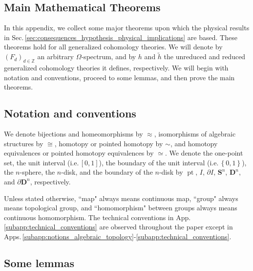 \documentclass[sort&compress]{elsarticle}
\theoremstyle{theoremstyle}
\theoremstyle{framedtheoremstyle}
\theoremstyle{definitionstyle}
\theoremstyle{definitionstyle}
\theoremstyle{definitionstyle}
\theoremstyle{definitionstyle}
\theoremstyle{nameddefinitionstyle}
\theoremstyle{framednameddefinitionstyle}
\theoremstyle{proofstyle}
\theoremstyle{definitionstyle}
\newcommand{\ZZZ}{\mathbb{Z}}
\newcommand{\DD}{\mathbf{D}}
\renewcommand{\SS}{\mathbf{S}}
\newcommand{\homeomorphic}{\approx}
\newcommand{\homotopic}{\simeq}
\newcommand{\isomorphic}{\cong}
\newcommand{\paren}[1]{\left( #1 \right)}
\newcommand{\braces}[1]{\left\{ #1 \right\}}
\DeclareMathOperator{\pt}{pt}
\begin{document}
\begin{appendices}

\section{Main Mathematical Theorems\label{app:proofs}}

In this appendix, we collect some major theorems upon which the physical results in Sec.\,\ref{sec:consequences_hypothesis_physical_implications} are based. These theorems hold for all generalized cohomology theories. We will denote by $\paren{F_d}_{d\in \ZZZ}$ an arbitrary $\Omega$-spectrum, and by $h$ and $\tilde h$ the unreduced and reduced generalized cohomology theories it defines, respectively. We will begin with notation and conventions, proceed to some lemmas, and then prove the main theorems.




\subsection{Notation and conventions\label{subsec:mathematical_notation_conventions}}

We denote bijections and homeomorphisms by $\homeomorphic$, isomorphisms of algebraic structures by $\isomorphic$, homotopy or pointed homotopy by $\sim$, and homotopy equivalences or pointed homotopy equivalences by $\homotopic$.
We denote the one-point set, the unit interval (i.e.\,$[0,1]$), the boundary of the unit interval (i.e.\,$\braces{0,1}$), the $n$-sphere, the $n$-disk, and the boundary of the $n$-disk by $\pt$, $I$, $\partial I$, $\SS^n$, $\DD^n$, and $\partial \DD^n$, respectively.

Unless stated otherwise, ``map" always means continuous map, ``group" always means topological group, and ``homomorphism" between groups always means continuous homomorphism. The technical conventions in App.\,\ref{subapp:technical_conventions} are observed throughout the paper except in Apps.\,\ref{subapp:notions_algebraic_topology}-\ref{subapp:technical_conventions}.

\subsection{Some lemmas\label{subapp:some_lemmas}}


\end{appendices}
\end{document}

